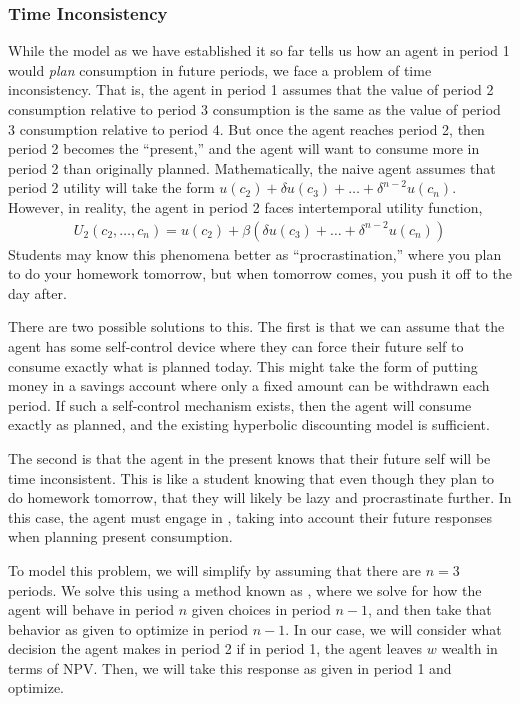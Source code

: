 \subsubsection*{Time Inconsistency}
While the model as we have established it so far tells us how an agent in period 1 would \emph{plan} consumption in future periods, we face a problem of time inconsistency. That is, the agent in period 1 assumes that the value of period 2 consumption relative to period 3 consumption is the same as the value of period 3 consumption relative to period 4. But once the agent reaches period 2, then period 2 becomes the ``present,'' and the agent will want to consume more in period 2 than originally planned. Mathematically, the naive agent assumes that period 2 utility will take the form $u(c_2) + \delta u(c_3) + \dots + \delta^{n - 2} u(c_n)$. However, in reality, the agent in period 2 faces intertemporal utility function,
\begin{align*}
    U_2(c_2, \dots, c_n) = u(c_2) + \beta (\delta u(c_3) + \dots + \delta^{n - 2} u(c_n))
\end{align*}
Students may know this phenomena better as ``procrastination,'' where you plan to do your homework tomorrow, but when tomorrow comes, you push it off to the day after.

There are two possible solutions to this. The first is that we can assume that the agent has some self-control device where they can force their future self to consume exactly what is planned today. This might take the form of putting money in a savings account where only a fixed amount can be withdrawn each period. If such a self-control mechanism exists, then the agent will consume exactly as planned, and the existing hyperbolic discounting model is sufficient. 

The second is that the agent in the present knows that their future self will be time inconsistent. This is like a student knowing that even though they plan to do homework tomorrow, that they will likely be lazy and procrastinate further. In this case, the agent must engage in , taking into account their future responses when planning present consumption. 

To model this problem, we will simplify by assuming that there are $n = 3$ periods. We solve this using a method known as , where we solve for how the agent will behave in period $n$ given choices in period $n - 1$, and then take that behavior as given to optimize in period $n - 1$. In our case, we will consider what decision the agent makes in period 2 if in period 1, the agent leaves $w$ wealth in terms of NPV. Then, we will take this response as given in period 1 and optimize. 

